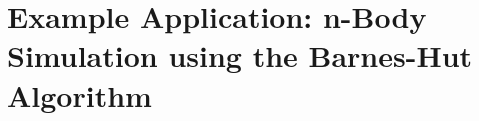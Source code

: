 \section{Example Application: n-Body Simulation using the Barnes-Hut Algorithm}

\cite{own_nbody}
\cite{own_nbody_edu}
